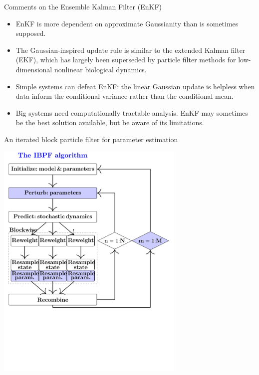 \documentclass{beamer}
\begin{document}
\begin{frame}{Comments on the Ensemble Kalman Filter (EnKF)}

  \begin{itemize}
  \item EnKF is more dependent on approximate Gaussianity than is sometimes supposed.

    \vspace{2mm}
    
  \item The Gaussian-inspired update rule is similar to the extended Kalman filter (EKF), which has largely been superseded by particle filter methods for low-dimensional nonlinear biological dynamics.

    \vspace{2mm}
    
\item Simple systems can defeat EnKF: the linear Gaussian update is helpless when data inform the conditional variance rather than the conditional mean.

  \vspace{2mm}
  
    \item Big systems need computationally tractable analysis. EnKF may sometimes be the best solution available, but be aware of its limitations.

  \end{itemize}

\end{frame}


\begin{frame}{An iterated block particle filter for parameter estimation}


  \begin{center}
    
  \includegraphics[trim={0 0 0 10mm},clip,width=9cm]{IBPF_workflow.pdf}


  \end{center}
  
\end{frame}
\end{document}
